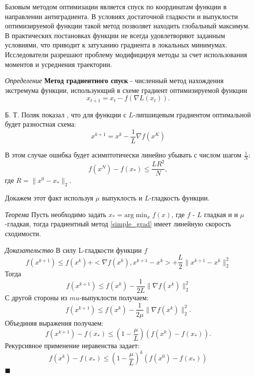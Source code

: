 Базовым методом оптимизации является спуск по координатам функции в направлении антиградиента. 
В условиях достаточной гладкости и выпуклости оптимизируемой функции такой метод позволяет находить глобальный максимум. 
В практических постановках функции не всегда удовлетворяют заданным условиями, что приводит к затуханию градиента 
в локальных минимумах. Исследователи разрешают проблему модифицируя методы за счет использования моментов
и усреднения траектории.

\textit{Определение} \textbf{Метод градиентного спуск} - численный метод нахождения экстремума функции, использующий
в схеме градиент оптимизируемой функции
\begin{equation}
    x_{t+1} = x_t - f(\nabla L(x_t)).
\end{equation}

Б. Т. Поляк показал \cite{polyak1990new}, что для функции с $L$-липшицевым градиентом оптимальной будет разностная схема: 
\begin{equation}
    x^{k+1} = x^k - \frac{1}{L} \nabla f(x^K)
    \label{simple_grad}
\end{equation}

В этом случае ошибка будет асимптотически линейно убывать с числом шагом $\frac{1}{N}$:
\begin{equation}
    f(x^N) -f(x_*) \le \frac{L R^2}{N},
\end{equation}
где $R=\| x^0 - x_* \|_2$. 

Докажем этот факт используя $\mu$ выпуклость и $L$-гладкость функции.

\textit{Теорема} Пусть необходимо задать $x_*=\text{arg} \min_x f(x)$, где $f$ - $L$ гладкая и
и $\mu$ -гладкая, тогда градиентный метод \ref{simple_grad} имеет линейную скорость сходимости.

\textit{Доказательство} В силу L-гладкости функции $f$
\begin{equation}
    f(x^{k+1}) \le f(x^k) + <\nabla f(x^k), x^{k+1} -x^k> +\frac{L}{2} \|x^{k+1}-x^k\|_2^2
\end{equation}
Тогда 
\begin{equation}
    f(x^{k+1}) \le f(x^k) - \frac{1}{2L} \| \nabla f(x^k) \|^2_2
\end{equation}
С другой стороны из $mu$-выпуклости получаем:
\begin{equation}
    f(x^{k+1}) \le f(x^k) - \frac{1}{2\mu} \| \nabla f(x^k) \|^2_2.
\end{equation}
Объединяя выражения получаем:
\begin{equation}
    f(x^{k+1}) -f(x_*) \le \left(1-\frac{\mu}{L}\right) (f(x^k)-f(x_*)).
\end{equation}
Рекурсивное применение неравенства задает:
\begin{equation}
    f(x^k) - f(x_*) \le (1-\frac{\mu}{L})^k (f(x^0)-f(x_*))
\end{equation}
$\blacksquare$

